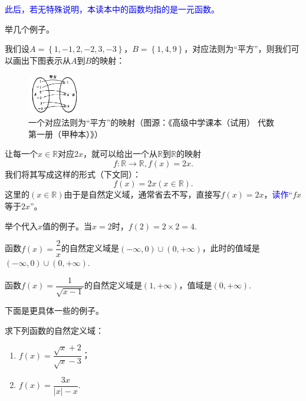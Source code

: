 \documentclass[lang=cn,math=cm,chinesefont=nofont,11pt,scheme=chinese,onecol]{elegantbook}
\begin{document}
\textcolor{blue}{此后，若无特殊说明，本读本中的函数均指的是一元函数。}

举几个例子。

\begin{example}
  我们设$A=\left\{1,-1,2,-2,3,-3\right\}$，$B=\left\{1,4,9\right\}$，对应法则为“平方”，则我们可以画出下图表示从$A$到$B$的映射：
\end{example}

\begin{figure}[h]
  \centering
  \includegraphics[width=0.2\textwidth]{image/map2.1.1.png}
  \caption{一个对应法则为“平方”的映射（图源：《高级中学课本（试用） 代数 第一册（甲种本）》）}
  \label{img:map1}
\end{figure}

\begin{example}\label{MapExample2}
  让每一个$x\in\mathbb{R}$对应$2x$，就可以给出一个从$\mathbb{R}$到$\mathbb{R}$的映射$$f:\mathbb{R}\rightarrow\mathbb{R},f(x)=2x.$$我们将其写成这样的形式（下文同）：$$f(x)=2x(x\in\mathbb{R}).$$这里的$(x\in\mathbb{R})$由于是自然定义域，通常省去不写，直接写$f(x)=2x$，\textcolor{blue}{读作}“$fx$等于$2x$”。

  举个代入$x$值的例子。当$x=2$时，$f(2)=2\times 2=4$.
\end{example}

\begin{spacing}{2.0}
  \begin{example}
    函数$f(x)=\dfrac{2}{x}$的自然定义域是$(-\infty,0)\cup(0,+\infty)$，此时的值域是$(-\infty,0)\cup(0,+\infty)$.
  \end{example}
  
  \begin{example}
    函数$f(x)=\dfrac{1}{\sqrt{x-1}}$的自然定义域是$(1,+\infty)$，值域是$(0,+\infty)$.
  \end{example}
  
  下面是更具体一些的例子。
  
  \begin{example}
    求下列函数的自然定义域：
  \end{example}
  
  \begin{enumerate}
    \item $f(x)=\dfrac{\sqrt{x}+2}{\sqrt{x}-3}$；
    \item $f(x)=\dfrac{3x}{\left| x \right|-x}$.
  \end{enumerate}
\end{spacing}
\end{document}
